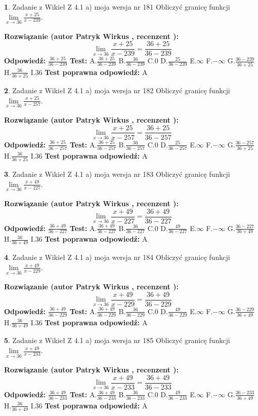 \documentclass[12pt, a4paper]{article}
\theoremstyle{definition} %
\newtheorem{zad}{}
\newcommand{\zadStart}[1]{\begin{zad}#1\newline}
\newcommand{\zadStop}{\end{zad}}
\newcommand{\rozwStart}[2]{\noindent \textbf{Rozwiązanie (autor #1 , recenzent #2): }\newline}
\newcommand{\rozwStop}{\newline}
\newcommand{\odpStart}{\noindent \textbf{Odpowiedź:}\newline}
\newcommand{\odpStop}{\newline}
\newcommand{\testStart}{\noindent \textbf{Test:}\newline}
\newcommand{\testStop}{\newline}
\newcommand{\kluczStart}{\noindent \textbf{Test poprawna odpowiedź:}\newline}
\newcommand{\kluczStop}{\newline}
\begin{document}
\zadStart{Zadanie z Wikieł Z 4.1 a) moja wersja nr 181}
Obliczyć granicę funkcji $\lim\limits_{x\to36}\frac{x+25}{x-239}$.
\zadStop
\rozwStart{Patryk Wirkus}{}
$$\lim\limits_{x\to36}\frac{x+25}{x-239} = \frac{36+25}{36-239}$$
\rozwStop
\odpStart
$\frac{36+25}{36-239}$
\odpStop
\testStart
A.$\frac{36+25}{36-239}$
B.$\frac{36}{36-239}$
C.$0$
D.$\frac{25}{36-239}$
E.$\infty$
F.$-\infty$
G.$\frac{36-239}{36+25}$
H.$\frac{36}{36+25}$
I.$36$
\testStop
\kluczStart
A
\kluczStop



\zadStart{Zadanie z Wikieł Z 4.1 a) moja wersja nr 182}
Obliczyć granicę funkcji $\lim\limits_{x\to36}\frac{x+25}{x-257}$.
\zadStop
\rozwStart{Patryk Wirkus}{}
$$\lim\limits_{x\to36}\frac{x+25}{x-257} = \frac{36+25}{36-257}$$
\rozwStop
\odpStart
$\frac{36+25}{36-257}$
\odpStop
\testStart
A.$\frac{36+25}{36-257}$
B.$\frac{36}{36-257}$
C.$0$
D.$\frac{25}{36-257}$
E.$\infty$
F.$-\infty$
G.$\frac{36-257}{36+25}$
H.$\frac{36}{36+25}$
I.$36$
\testStop
\kluczStart
A
\kluczStop



\zadStart{Zadanie z Wikieł Z 4.1 a) moja wersja nr 183}
Obliczyć granicę funkcji $\lim\limits_{x\to36}\frac{x+49}{x-227}$.
\zadStop
\rozwStart{Patryk Wirkus}{}
$$\lim\limits_{x\to36}\frac{x+49}{x-227} = \frac{36+49}{36-227}$$
\rozwStop
\odpStart
$\frac{36+49}{36-227}$
\odpStop
\testStart
A.$\frac{36+49}{36-227}$
B.$\frac{36}{36-227}$
C.$0$
D.$\frac{49}{36-227}$
E.$\infty$
F.$-\infty$
G.$\frac{36-227}{36+49}$
H.$\frac{36}{36+49}$
I.$36$
\testStop
\kluczStart
A
\kluczStop



\zadStart{Zadanie z Wikieł Z 4.1 a) moja wersja nr 184}
Obliczyć granicę funkcji $\lim\limits_{x\to36}\frac{x+49}{x-229}$.
\zadStop
\rozwStart{Patryk Wirkus}{}
$$\lim\limits_{x\to36}\frac{x+49}{x-229} = \frac{36+49}{36-229}$$
\rozwStop
\odpStart
$\frac{36+49}{36-229}$
\odpStop
\testStart
A.$\frac{36+49}{36-229}$
B.$\frac{36}{36-229}$
C.$0$
D.$\frac{49}{36-229}$
E.$\infty$
F.$-\infty$
G.$\frac{36-229}{36+49}$
H.$\frac{36}{36+49}$
I.$36$
\testStop
\kluczStart
A
\kluczStop



\zadStart{Zadanie z Wikieł Z 4.1 a) moja wersja nr 185}
Obliczyć granicę funkcji $\lim\limits_{x\to36}\frac{x+49}{x-233}$.
\zadStop
\rozwStart{Patryk Wirkus}{}
$$\lim\limits_{x\to36}\frac{x+49}{x-233} = \frac{36+49}{36-233}$$
\rozwStop
\odpStart
$\frac{36+49}{36-233}$
\odpStop
\testStart
A.$\frac{36+49}{36-233}$
B.$\frac{36}{36-233}$
C.$0$
D.$\frac{49}{36-233}$
E.$\infty$
F.$-\infty$
G.$\frac{36-233}{36+49}$
H.$\frac{36}{36+49}$
I.$36$
\testStop
\kluczStart
A
\kluczStop
\end{document}
